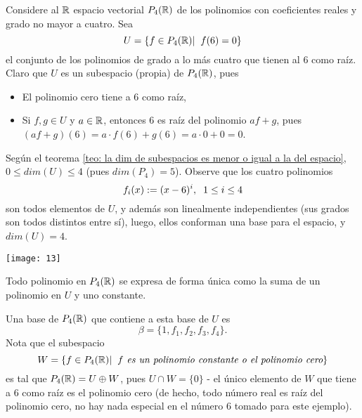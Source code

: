 \begin{ejem}
Considere al $\mathbb{R}$ espacio vectorial $P_{4}(\mathbb{R})$ de los polinomios
con coeficientes reales y grado no mayor a cuatro.
Sea
\[
U = \{ f \in P_{4}(\mathbb{R})  | \hspace{0.2cm} f(6) = 0 \}
\]
el conjunto de los polinomios de grado a lo más cuatro que tienen al
$6$ como raíz. Claro que $U$ es un subespacio
(propia) de $P_{4}(\mathbb{R})$,
pues
\begin{itemize}
	\item El polinomio cero tiene a $6$ como raíz,
	\item Si $f, g \in U$ y $a \in \mathbb{R}$, entonces $6$ es raíz del polinomio
	$af + g$, pues $(af+g)(6) = a \cdot f(6) + g(6) = a \cdot 0 + 0 = 0$.
\end{itemize}
Según el teorema \ref{teo: la dim de subespacios es menor o igual a la del espacio},
$0 \leq dim(U) \leq 4$ (pues $dim(P_{4}) = 5$).
Observe que los cuatro polinomios
\[
f_{i}(x) := (x-6)^{i}, \hspace{0.2cm}
1 \leq i \leq 4
\]
son todos elementos de $U$, y además son linealmente independientes
(sus grados son todos distintos entre sí), luego,
ellos conforman una base para el espacio, y $dim(U) = 4$.

\begin{marginfigure}
\texttt{[image: 13]} 
		\caption{Todo polinomio en $P_{4}(\mathbb{R})$ se
expresa de forma única como la suma de un polinomio en $U$ y 
uno constante.}
\end{marginfigure}

Una base de $P_{4}(\mathbb{R})$ que contiene a esta base de $U$ es
\[
\beta = \{ 1, f_{1}, f_{2}, f_{3}, f_{4} \}.
\]
Nota que el subespacio
\[
W = \{ f \in P_{4}(\mathbb{R})  | \hspace{0.2cm} f \textit{ es un
polinomio constante o el polinomio cero} \}
\]
es tal que $P_{4}(\mathbb{R}) = U \oplus W$, pues
$U \cap W = \{ 0 \}$ - el único elemento de $W$ que tiene
a $6$ como raíz es el polinomio cero (de hecho, todo número
real es raíz del polinomio cero, no hay nada especial en el número
$6$ tomado para este ejemplo).
\end{ejem}


